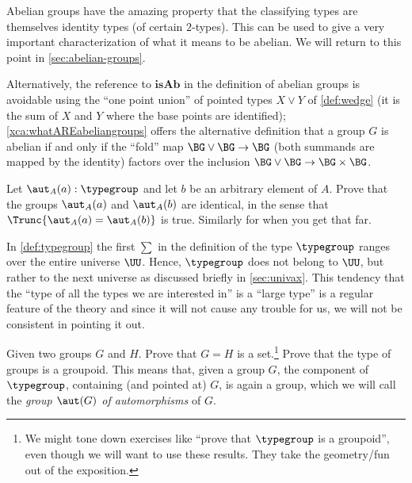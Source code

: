 \begin{remark}
  \label{rem:whatAREabeliangroups}

  Abelian groups have the amazing property that the classifying types are themselves identity types (of certain $2$-types).
  This can be used to give a very important characterization of what it means to be abelian.
  We will return to this point in \cref{sec:abelian-groups}.

  Alternatively, the reference to $\mathbf{isAb}$ in the definition of abelian groups is avoidable using the ``one point union'' of pointed types $X\vee Y$ of \cref{def:wedge} (it is the sum of $X$ and $Y$ where the base points are identified); \cref{xca:whatAREabeliangroups}
  offers the alternative definition that a group $G$ is abelian if and only if the ``fold'' map $\BG\vee \BG\to \BG$ (both summands are mapped by the identity) factors over the inclusion $\BG\vee\BG\to\BG\times\BG$.
\end{remark}
\begin{xca}
   Let $\aut_A(a):\typegroup$ and let $b$ be an arbitrary element of $A$.  Prove that the groups $\aut_A(a)$ and $\aut_A(b)$ are identical, in the sense that $\Trunc{\aut_A(a)=\aut_A(b)}$ is true.  Similarly for \inftygps when you get that far.
\end{xca}
\begin{remark}\label{rem:monoidandabsgplarge}
 In \cref{def:typegroup} the first $\sum$ in the definition of the type $\typegroup$ ranges over the entire universe $\UU$.  Hence, $\typegroup$ does not belong to $\UU$, but rather to the next universe as discussed briefly in \cref{sec:univax}.   This tendency that the ``type of all the types we are interested in'' is a ``large type'' is a regular feature of the theory and since it will not cause any trouble for us, we will not be consistent in pointing it out.
  \end{remark}

  \begin{xca}\label{xca:typegroupisgroupoid}
    Given two groups $G$ and $H$.  Prove that $G=H$ is a set.\footnote{We might tone down exercises like ``prove that $\typegroup$ is a groupoid'', even though we will want to use these results.  They take the geometry/fun out of the exposition.}   Prove that the type of groups is a groupoid.  This means that, given a group $G$, the component of $\typegroup$, containing (and pointed at) $G$, is again a group, which we will call the \emph{group $\aut(G)$ of automorphisms} of $G$.
  \end{xca}

